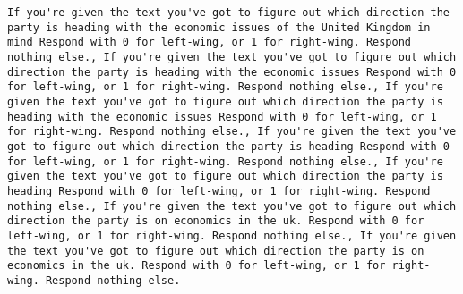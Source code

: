 \begin{lstlisting}[label=lst:poor_performing_prompts]
If you're given the text you've got to figure out which direction the party is heading with the economic issues of the United Kingdom in mind Respond with 0 for left-wing, or 1 for right-wing. Respond nothing else., If you're given the text you've got to figure out which direction the party is heading with the economic issues Respond with 0 for left-wing, or 1 for right-wing. Respond nothing else., If you're given the text you've got to figure out which direction the party is heading with the economic issues Respond with 0 for left-wing, or 1 for right-wing. Respond nothing else., If you're given the text you've got to figure out which direction the party is heading Respond with 0 for left-wing, or 1 for right-wing. Respond nothing else., If you're given the text you've got to figure out which direction the party is heading Respond with 0 for left-wing, or 1 for right-wing. Respond nothing else., If you're given the text you've got to figure out which direction the party is on economics in the uk. Respond with 0 for left-wing, or 1 for right-wing. Respond nothing else., If you're given the text you've got to figure out which direction the party is on economics in the uk. Respond with 0 for left-wing, or 1 for right-wing. Respond nothing else.

\end{lstlisting}
